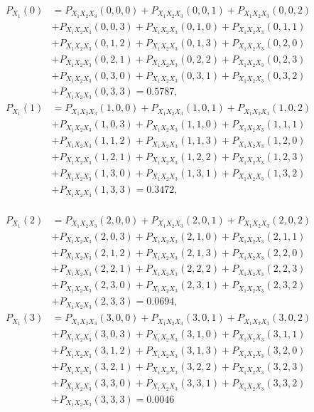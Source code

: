 \documentclass[]{book}
\begin{document}
\[
\begin{array}{rl}
P_{X_1}(0) 
& = P_{X_1X_2X_3}(0,0,0)+P_{X_1X_2X_3}(0,0,1)+P_{X_1X_2X_3}(0,0,2)\\
& +P_{X_1X_2X_3}(0,0,3)+P_{X_1X_2X_3}(0,1,0)+P_{X_1X_2X_3}(0,1,1)\\
& +P_{X_1X_2X_3}(0,1,2)+P_{X_1X_2X_3}(0,1,3)+P_{X_1X_2X_3}(0,2,0)\\
& +P_{X_1X_2X_3}(0,2,1)+P_{X_1X_2X_3}(0,2,2)+P_{X_1X_2X_3}(0,2,3)\\
& +P_{X_1X_2X_3}(0,3,0)+P_{X_1X_2X_3}(0,3,1)+P_{X_1X_2X_3}(0,3,2)\\
& +P_{X_1X_2X_3}(0,3,3)=0.5787,\\
P_{X_1}(1) 
& = P_{X_1X_2X_3}(1,0,0)+P_{X_1X_2X_3}(1,0,1)+P_{X_1X_2X_3}(1,0,2)\\
& +P_{X_1X_2X_3}(1,0,3)+P_{X_1X_2X_3}(1,1,0)+P_{X_1X_2X_3}(1,1,1)\\
& +P_{X_1X_2X_3}(1,1,2)+P_{X_1X_2X_3}(1,1,3)+P_{X_1X_2X_3}(1,2,0)\\
& +P_{X_1X_2X_3}(1,2,1)+P_{X_1X_2X_3}(1,2,2)+P_{X_1X_2X_3}(1,2,3)\\
& +P_{X_1X_2X_3}(1,3,0)+P_{X_1X_2X_3}(1,3,1)+P_{X_1X_2X_3}(1,3,2)\\ 
& + P_{X_1X_2X_3}(1,3,3)=0.3472,\\
\end{array}
\]

\[
\begin{array}{rl}
P_{X_1}(2) 
& = P_{X_1X_2X_3}(2,0,0)+P_{X_1X_2X_3}(2,0,1)+P_{X_1X_2X_3}(2,0,2)\\
& + P_{X_1X_2X_3}(2,0,3)+P_{X_1X_2X_3}(2,1,0)+P_{X_1X_2X_3}(2,1,1)\\
& + P_{X_1X_2X_3}(2,1,2)+P_{X_1X_2X_3}(2,1,3)+P_{X_1X_2X_3}(2,2,0)\\
& + P_{X_1X_2X_3}(2,2,1)+P_{X_1X_2X_3}(2,2,2)+P_{X_1X_2X_3}(2,2,3)\\
& + P_{X_1X_2X_3}(2,3,0)+P_{X_1X_2X_3}(2,3,1)+P_{X_1X_2X_3}(2,3,2)\\
& + P_{X_1X_2X_3}(2,3,3)=0.0694,\\
P_{X_1}(3) 
& = P_{X_1X_2X_3}(3,0,0)+P_{X_1X_2X_3}(3,0,1)+P_{X_1X_2X_3}(3,0,2)\\
& + P_{X_1X_2X_3}(3,0,3)+P_{X_1X_2X_3}(3,1,0)+P_{X_1X_2X_3}(3,1,1)\\
& + P_{X_1X_2X_3}(3,1,2)+P_{X_1X_2X_3}(3,1,3)+P_{X_1X_2X_3}(3,2,0)\\
& + P_{X_1X_2X_3}(3,2,1)+P_{X_1X_2X_3}(3,2,2)+P_{X_1X_2X_3}(3,2,3)\\
& + P_{X_1X_2X_3}(3,3,0)+P_{X_1X_2X_3}(3,3,1)+P_{X_1X_2X_3}(3,3,2)\\ 
& + P_{X_1X_2X_3}(3,3,3)=0.0046
\end{array}
\]
\end{document}
